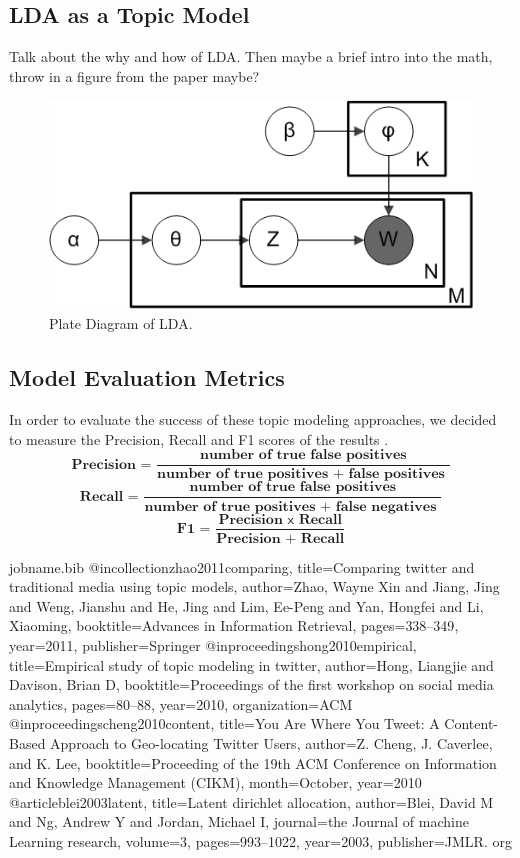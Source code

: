\documentclass{acm_proc_article-sp}
\begin{document}
\subsection{LDA as a Topic Model}
\hspace*{5mm}Talk about the why and how of LDA. Then maybe a brief intro into the math, throw in a figure from the paper maybe?
\begin{figure}[h]
\includegraphics[scale=0.47]{figs/Smoothed_LDA}
\caption{Plate Diagram of LDA.}
\end{figure}
\subsection{Model Evaluation Metrics}
\hspace*{5mm}In order to evaluate the success of these topic modeling approaches, we decided to measure the Precision, Recall and F1 scores of the results \cite{hong2010empirical}. 
\[ \textbf{Precision = }\frac{\textbf{number of true false positives}}{\textbf{number of true positives } \mathsf{+} \textbf{ false positives }} \]
\[ \textbf{Recall = }\frac{\textbf{number of true false positives}}{\textbf{number of true positives } \mathsf{+} \textbf{ false negatives }} \]
\[ \textbf{F1 = }\frac{\textbf{Precision } \mathsf{x} \textbf{ Recall}}{\textbf{Precision } \mathsf{+} \textbf{ Recall}} \]


\begin{filecontents}{jobname.bib}
@incollection{zhao2011comparing,
	title={Comparing twitter and traditional media using topic models},
	author={Zhao, Wayne Xin and Jiang, Jing and Weng, Jianshu and He, Jing and Lim, Ee-Peng and Yan, Hongfei and Li, Xiaoming},
	booktitle={Advances in Information Retrieval},
	pages={338--349},
	year={2011},
	publisher={Springer}
}
@inproceedings{hong2010empirical,
	title={Empirical study of topic modeling in twitter},
	author={Hong, Liangjie and Davison, Brian D},
	booktitle={Proceedings of the first workshop on social media analytics},
	pages={80--88},
	year={2010},
	organization={ACM}
}
@inproceedings{cheng2010content,
	title={You Are Where You Tweet: A Content-Based Approach to Geo-locating Twitter Users},
	author={Z. Cheng, J. Caverlee, and K. Lee},
	booktitle={Proceeding of the 19th ACM Conference on Information and Knowledge Management (CIKM)},
	month={October},
	year={2010}
}
@article{blei2003latent,
	title={Latent dirichlet allocation},
	author={Blei, David M and Ng, Andrew Y and Jordan, Michael I},
	journal={the Journal of machine Learning research},
	volume={3},
	pages={993--1022},
	year={2003},
	publisher={JMLR. org}
}
\end{filecontents}

\nocite{*}




\end{document}
